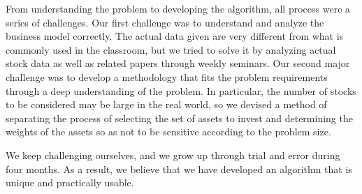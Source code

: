\documentclass[11pt]{article}
\begin{document}
	From understanding the problem to developing the algorithm, all process were a series of challenges. Our first challenge was to understand and analyze the business model correctly. The actual data given are very different from what is commonly used in the classroom, but we tried to solve it by analyzing actual stock data as well as related papers through weekly seminars. Our second major challenge was to develop a methodology that fits the problem requirements through a deep understanding of the problem. In particular, the number of stocks to be considered may be large in the real world, so we devised a method of separating the process of selecting the set of assets to invest and determining the weights of the assets so as not to be sensitive according to the problem size.
	
	We keep challenging ourselves, and we grow up through trial and error during four months. As a result, we believe that we have developed an algorithm that is unique and practically usable.
	
	
	
\end{document}
